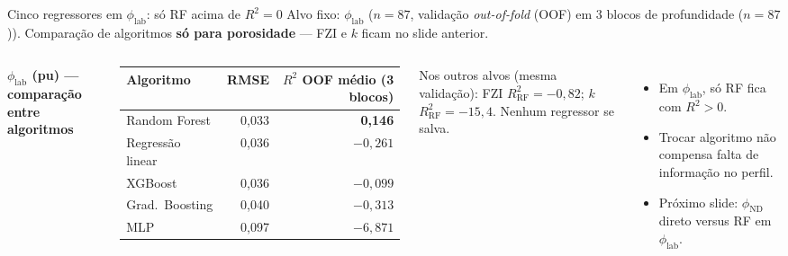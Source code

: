 \documentclass[aspectratio=169,10pt]{beamer}
\newcommand{\philab}{\ensuremath{\phi_{\mathrm{lab}}}}
\newcommand{\phiND}{\ensuremath{\phi_{\mathrm{ND}}}}
\newcommand{\oofcv}{validação \emph{out-of-fold} (OOF) em 3 blocos de profundidade ($n=87$)}
\newcommand{\rSqOOF}{$R^2$ OOF médio (3 blocos)}
\begin{document}
\begin{frame}{Cinco regressores em \philab{}: só RF acima de $R^2=0$}
  \footnotesize
  Alvo fixo: \philab{} ($n=87$, \oofcv). Comparação de algoritmos
  \textbf{só para porosidade} --- FZI e $k$ ficam no slide anterior.
  \vspace{0.06cm}
  \begin{columns}[T,onlytextwidth]
    \textbf{\philab{} (pu) --- comparação entre algoritmos}
    \vspace{0.04cm}
    \begin{tabular}{lrr}
      \toprule
      Algoritmo & RMSE & \rSqOOF \\
      \midrule
      Random Forest & 0,033 & \textbf{0,146} \\
      Regressão linear & 0,036 & $-0{,}261$ \\
      XGBoost & 0,036 & $-0{,}099$ \\
      Grad.\ Boosting & 0,040 & $-0{,}313$ \\
      MLP & 0,097 & $-6{,}871$ \\
      \bottomrule
    \end{tabular}
    \vspace{0.08cm}
    {\scriptsize
    Nos outros alvos (mesma validação): FZI $R^2_{\mathrm{RF}}=-0{,}82$;
    $k$ $R^2_{\mathrm{RF}}=-15{,}4$. Nenhum regressor se salva.}
    \begin{itemize}
      \item Em \philab, só RF fica com $R^2>0$.
      \item Trocar algoritmo não compensa falta de informação no perfil.
      \item Próximo slide: \phiND{} direto versus RF em \philab.
    \end{itemize}
  \end{columns}
\end{frame}
\end{document}
